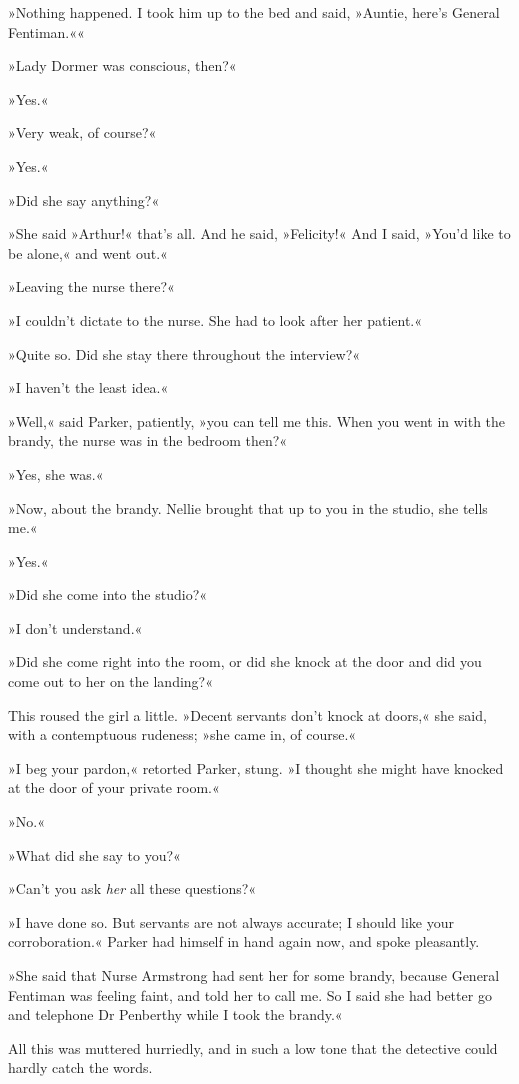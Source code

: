 »Nothing happened. I took him up to the bed and said, »Auntie, here's General Fentiman.««

»Lady Dormer was conscious, then?«

»Yes.«

»Very weak, of course?«

»Yes.«

»Did she say anything?«

»She said »Arthur!« that's all. And he said, »Felicity!« And I said, »You'd like to be alone,« and went out.«

»Leaving the nurse there?«

»I couldn't dictate to the nurse. She had to look after her patient.«

»Quite so. Did she stay there throughout the interview?«

»I haven't the least idea.«

»Well,« said Parker, patiently, »you can tell me this. When you went in with the brandy, the nurse was in the bedroom then?«

»Yes, she was.«

»Now, about the brandy. Nellie brought that up to you in the studio, she tells me.«

»Yes.«

»Did she come into the studio?«

»I don't understand.«

»Did she come right into the room, or did she knock at the door and did you come out to her on the landing?«

This roused the girl a little. »Decent servants don't knock at doors,« she said, with a contemptuous rudeness; »she came in, of course.«

»I beg your pardon,« retorted Parker, stung. »I thought she might have knocked at the door of your private room.«

»No.«

»What did she say to you?«

»Can't you ask \textit{her} all these questions?«

»I have done so. But servants are not always accurate; I should like your corroboration.« Parker had himself in hand again now, and spoke pleasantly.

»She said that Nurse Armstrong had sent her for some brandy, because General Fentiman was feeling faint, and told her to call me. So I said she had better go and telephone Dr Penberthy while I took the brandy.«

All this was muttered hurriedly, and in such a low tone that the detective could hardly catch the words.


